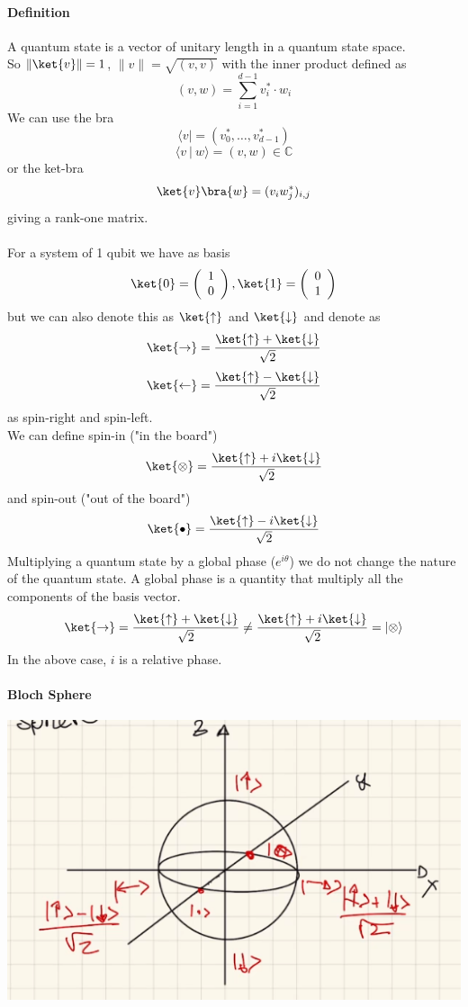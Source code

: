 \documentclass[10pt]{report}
\begin{document}
\paragraph{Definition} A quantum state is a vector of unitary length in a quantum state space.\\
So $\| \ket{v}\| = 1$, $\|v\|=\sqrt{(v,v)}$ with the inner product defined as
$$(v,w)=\sum_{i=1}^{d-1}v_i^*\cdot w_i$$
We can use the bra $$\langle v| = (v_0^*,\ldots,v_{d-1}^*)$$
$$\langle v\:|\:w\rangle = (v,w)\in \mathbb{C}$$
or the ket-bra $$\ket{v}\bra{w} = (v_iw_j^*)_{i,j}$$ giving a rank-one matrix.
\paragraph{} For a system of 1 qubit we have as basis $$\ket{0} = \left(\begin{array}{c}
1\\0
\end{array}\right), \ket{1}=\left(\begin{array}{c}
0\\1
\end{array}\right)$$ but we can also denote this as $\ket{\uparrow}$ and $\ket{\downarrow}$ and denote as $$\ket{\rightarrow} = \frac{\ket{\uparrow} + \ket{\downarrow}}{\sqrt{2}}$$
$$\ket{\leftarrow} = \frac{\ket{\uparrow} - \ket{\downarrow}}{\sqrt{2}}$$
as spin-right and spin-left.\\
We can define spin-in ("in the board")
$$\ket{\otimes} = \frac{\ket{\uparrow} + i\ket{\downarrow}}{\sqrt{2}}$$
and spin-out ("out of the board")
$$\ket{\bullet} = \frac{\ket{\uparrow} - i\ket{\downarrow}}{\sqrt{2}}$$
Multiplying a quantum state by a global phase ($e^{i\theta}$) we do not change the nature of the quantum state. A global phase is a quantity that multiply all the components of the basis vector.
$$\ket{\rightarrow} = \frac{\ket{\uparrow} + \ket{\downarrow}}{\sqrt{2}} \neq \frac{\ket{\uparrow} + i\ket{\downarrow}}{\sqrt{2}} = |
\otimes\rangle$$
In the above case, $i$ is a relative phase.
\paragraph{Bloch Sphere} %
\begin{center}
	\includegraphics[scale=0.5]{11.png}
\end{center}
\end{document}

